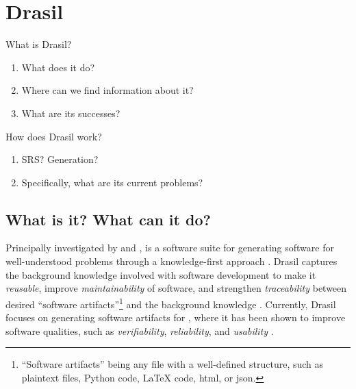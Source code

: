 \chapter{Drasil}
\label{chap:drasil}

\begin{writingdirectives}

      \item What is Drasil?
      \begin{enumerate}
            \item What does it do?
            \item Where can we find information about it?
            \item What are its successes?
      \end{enumerate}

      \item How does Drasil work?
      \begin{enumerate}
            \item SRS? Generation?
            \item Specifically, what are its current problems?
      \end{enumerate}

\end{writingdirectives}

\drasilLogoImg{}

\section{What is it? What can it do?}
\label{chap:drasil:sec:what-is-it-what-can-it-do}

Principally investigated by  and ,
 is a software suite
for generating software for well-understood problems through a knowledge-first
approach \cite{Drasil2021}. Drasil captures the background knowledge involved
with software development to make it \textit{reusable}, improve
\textit{maintainability} of software, and strengthen \textit{traceability}
between desired ``software artifacts''\footnote{``Software artifacts'' being any
      file with a well-defined structure, such as plaintext files, Python code,
      \LaTeX{} code, \acs{html}, or \acs{json}.} and the background knowledge
\cite{SzymczakEtAl2016}. Currently, Drasil focuses on generating software
artifacts for , where it has been shown to improve software qualities,
such as \textit{verifiability}, \textit{reliability}, and \textit{usability}
\cite{Smith2018}.

